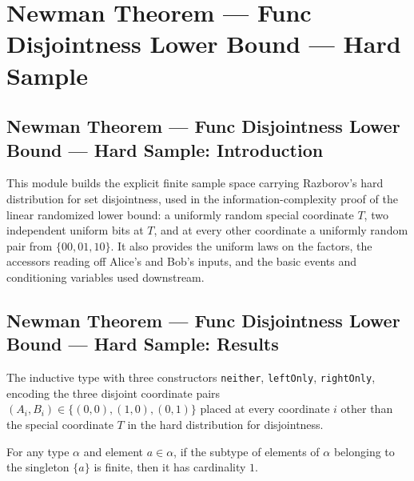 \section{Newman Theorem --- Func Disjointness Lower Bound --- Hard Sample}
\subsection*{Newman Theorem --- Func Disjointness Lower Bound --- Hard Sample: Introduction}

This module builds the explicit finite sample space carrying Razborov's hard distribution
for set disjointness, used in the information-complexity proof of the linear randomized
lower bound: a uniformly random special coordinate $T$, two independent uniform bits at
$T$, and at every other coordinate a uniformly random pair from $\{00, 01, 10\}$.  It also
provides the uniform laws on the factors, the accessors reading off Alice's and Bob's
inputs, and the basic events and conditioning variables used downstream.

\subsection*{Newman Theorem --- Func Disjointness Lower Bound --- Hard Sample: Results}

\begin{definition}
\label{CommunicationComplexity.Functions.Disjointness.RandomizedLowerBound.DisjointCoordinate}
\leanok
The inductive type with three constructors \texttt{neither}, \texttt{leftOnly},
\texttt{rightOnly}, encoding the three disjoint coordinate pairs
$(A_i, B_i) \in \{(0,0), (1,0), (0,1)\}$ placed at every coordinate $i$ other than the
special coordinate $T$ in the hard distribution for disjointness.
\end{definition}

\begin{theorem}
\label{CommunicationComplexity.Functions.Disjointness.RandomizedLowerBound.card_subtype_singleton_eq_one}
\leanok
{}
For any type $\alpha$ and element $a\in\alpha$, if the subtype of elements of $\alpha$
belonging to the singleton $\{a\}$ is finite, then it has cardinality $1$.
\end{theorem}
